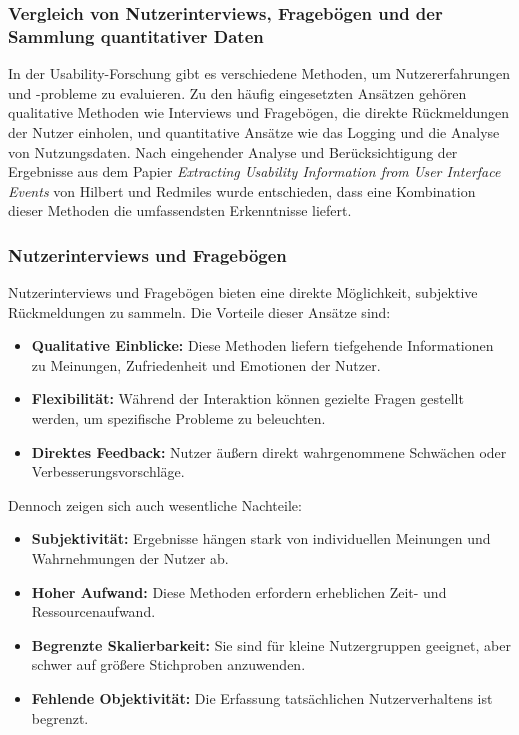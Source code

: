 \documentclass[12pt,oneside]{article}
\begin{document}
\subsubsection{Vergleich von Nutzerinterviews, Fragebögen und der Sammlung quantitativer Daten}

In der Usability-Forschung gibt es verschiedene Methoden, um Nutzererfahrungen und -probleme zu evaluieren. Zu den häufig eingesetzten Ansätzen gehören qualitative Methoden wie Interviews und Fragebögen, die direkte Rückmeldungen der Nutzer einholen, und quantitative Ansätze wie das Logging und die Analyse von Nutzungsdaten. Nach eingehender Analyse und Berücksichtigung der Ergebnisse aus dem Papier \textit{Extracting Usability Information from User Interface Events} von Hilbert und Redmiles \cite{Hilbert2000} wurde entschieden, dass eine Kombination dieser Methoden die umfassendsten Erkenntnisse liefert.

\subsubsection{Nutzerinterviews und Fragebögen}
Nutzerinterviews und Fragebögen bieten eine direkte Möglichkeit, subjektive Rückmeldungen zu sammeln. Die Vorteile dieser Ansätze sind:
\begin{itemize}
    \item \textbf{Qualitative Einblicke:} Diese Methoden liefern tiefgehende Informationen zu Meinungen, Zufriedenheit und Emotionen der Nutzer.
    \item \textbf{Flexibilität:} Während der Interaktion können gezielte Fragen gestellt werden, um spezifische Probleme zu beleuchten.
    \item \textbf{Direktes Feedback:} Nutzer äußern direkt wahrgenommene Schwächen oder Verbesserungsvorschläge.
\end{itemize}
Dennoch zeigen sich auch wesentliche Nachteile:
\begin{itemize}
    \item \textbf{Subjektivität:} Ergebnisse hängen stark von individuellen Meinungen und Wahrnehmungen der Nutzer ab.
    \item \textbf{Hoher Aufwand:} Diese Methoden erfordern erheblichen Zeit- und Ressourcenaufwand.
    \item \textbf{Begrenzte Skalierbarkeit:} Sie sind für kleine Nutzergruppen geeignet, aber schwer auf größere Stichproben anzuwenden.
    \item \textbf{Fehlende Objektivität:} Die Erfassung tatsächlichen Nutzerverhaltens ist begrenzt.
\end{itemize}
\end{document}
